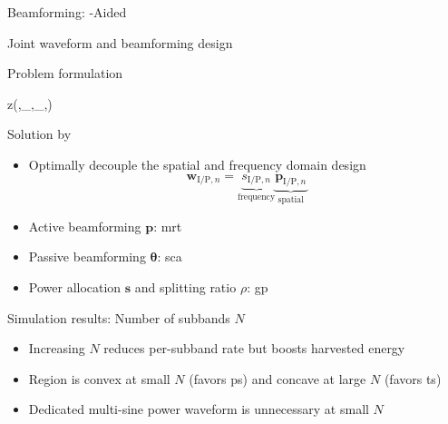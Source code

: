 \documentclass[presentation,xcolor={table},9pt]{beamer}
\begin{document}
\begin{section}{Beamforming: -Aided }
	\begin{frame}{Joint waveform and beamforming design}
		\begin{block}{Problem formulation}
			\vspace{-0.25cm}
			\begin{maxi*}
				{}{z(\boldsymbol{\theta},\mathbf{W}_,_,\rho)}{}{}
			\end{maxi*}
		\end{block}
		\begin{exampleblock}{Solution by }
			\begin{itemize}
				\item Optimally decouple the spatial and frequency domain design
				\begin{equation*}
					\mathbf{w}_{\mathrm{I/P}, n} = \underbrace{s_{\mathrm{I/P}, n}}_\text{frequency} \underbrace{\mathbf{p}_{\mathrm{I/P}, n}}_\text{spatial}
				\end{equation*}
				\item Active beamforming $\mathbf{p}$: \gls{mrt}
				\item Passive beamforming $\boldsymbol{\theta}$: \gls{sca}
				\item Power allocation $\mathbf{s}$ and splitting ratio $\rho$: \gls{gp}
			\end{itemize}
		\end{exampleblock}
	\end{frame}

	\begin{frame}{Simulation results: Number of subbands $N$}
		\begin{figure}
			\centering
		\end{figure}
		\begin{itemize}
			\item Increasing $N$ reduces per-subband rate but boosts harvested energy
			\item Region is convex at small $N$ (favors \gls{ps}) and concave at large $N$ (favors \gls{ts})
			\item Dedicated multi-sine power waveform is unnecessary at small $N$
		\end{itemize}
	\end{frame}


\end{section}
\end{document}
